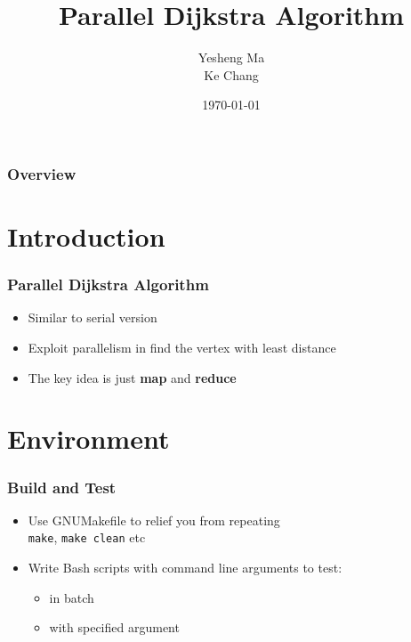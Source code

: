 \documentclass{beamer}
\title[Short title]{Parallel Dijkstra Algorithm} %
\author{Yesheng Ma\\Ke Chang} %
\institute[UCLA] %
{

}
\date{\today} %
\begin{document}
\begin{frame}
\titlepage %
\end{frame}

\begin{frame}
\frametitle{Overview} %
\tableofcontents %
\end{frame}


\section{Introduction} 


\begin{frame}
\frametitle{Parallel Dijkstra Algorithm}
\begin{itemize}
	\item Similar to serial version
	\item Exploit parallelism in find the vertex with least distance
	\item The key idea is just \textbf{map} and \textbf{reduce}
\end{itemize}
\end{frame}

\section{Environment}
\begin{frame}
\frametitle{Build and Test}
\begin{itemize}
\item Use GNUMakefile to relief you from repeating\\
		\qquad \texttt{make}, \texttt{make clean} etc
\item Write Bash scripts with command line arguments to test:
\begin{itemize}
	\item in batch
	\item with specified argument
\end{itemize}
 
\end{itemize}
\end{frame}
\end{document}
